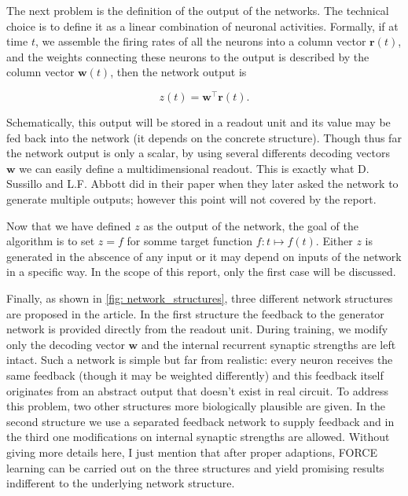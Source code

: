 The next problem is the definition of the output of the networks. The
technical choice is to define it as a linear combination of neuronal
activities. Formally, if at time $t$, we assemble the firing rates of all
the neurons into a column vector $\mathbf{r}(t)$, and the weights 
connecting these neurons to the output is described by the column vector
$\mathbf{w}(t)$, then the network output is

\[z(t) = \mathbf{w}^{\top}\mathbf{r}(t).\]

Schematically, this output will be stored in a readout unit and its
value may be fed back into the network (it depends on the concrete
structure). Though thus far the network output is only a scalar, by using
several differents decoding vectors $\mathbf{w}$ we can easily define
a multidimensional readout. This is exactly what D. Sussillo and L.F.
Abbott did in their paper when they later asked the network to generate
multiple outputs; however this point will not covered by the report.

Now that we have defined $z$ as the output of the network, the goal
of the algorithm is to set $z = f$ for somme target function 
$f: t \mapsto f(t)$. Either $z$ is generated in the abscence of any input
or it may depend on inputs of the network in a specific way. In the scope
of this report, only the first case will be discussed.

Finally, as shown in \autoref{fig: network_structures}, three different 
network structures are proposed in the article. In the first structure
the feedback to the generator network is provided directly from the readout
unit. During training, we modify only the decoding vector $\mathbf{w}$
and the internal recurrent synaptic strengths are left intact.
Such a network is simple but far from realistic: every neuron receives the
same feedback (though it may be weighted differently) and this feedback
itself originates from an abstract output that doesn't exist in real circuit.
To address this problem, two other structures more biologically plausible
are given. In the second structure we use a separated feedback network to 
supply feedback and in the third one modifications on internal synaptic
strengths are allowed. Without giving more details here, I just mention 
that after proper adaptions, FORCE learning can be carried out on the
three structures and yield promising results indifferent to the
underlying network structure.

